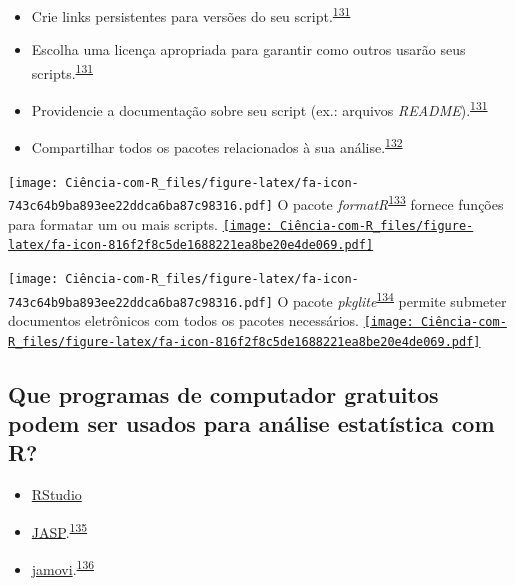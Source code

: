 \documentclass[
]{book}
\begin{document}
\begin{itemize}
\item
  Crie links persistentes para versões do seu script.\textsuperscript{\protect\hyperlink{ref-Eglen2017}{131}}
\item
  Escolha uma licença apropriada para garantir como outros usarão seus scripts.\textsuperscript{\protect\hyperlink{ref-Eglen2017}{131}}
\item
  Providencie a documentação sobre seu script (ex.: arquivos \emph{README}).\textsuperscript{\protect\hyperlink{ref-Eglen2017}{131}}
\item
  Compartilhar todos os pacotes relacionados à sua análise.\textsuperscript{\protect\hyperlink{ref-Zhao2023}{132}}
\end{itemize}

\texttt{[image: Ciência-com-R\_files/figure-latex/fa-icon-743c64b9ba893ee22ddca6ba87c98316.pdf]} O pacote \emph{formatR}\textsuperscript{\protect\hyperlink{ref-formatR}{133}} fornece funções para formatar um ou mais scripts. \href{https://cran.r-project.org/web/packages/formatR/index.html}{\texttt{[image: Ciência-com-R\_files/figure-latex/fa-icon-816f2f8c5de1688221ea8be20e4de069.pdf]}}

\texttt{[image: Ciência-com-R\_files/figure-latex/fa-icon-743c64b9ba893ee22ddca6ba87c98316.pdf]} O pacote \emph{pkglite}\textsuperscript{\protect\hyperlink{ref-pkglite}{134}} permite submeter documentos eletrônicos com todos os pacotes necessários. \href{https://cran.rstudio.com/web/packages/pkglite/index.html}{\texttt{[image: Ciência-com-R\_files/figure-latex/fa-icon-816f2f8c5de1688221ea8be20e4de069.pdf]}}

\hypertarget{que-programas-de-computador-gratuitos-podem-ser-usados-para-anuxe1lise-estatuxedstica-com-r}{%
\subsection{Que programas de computador gratuitos podem ser usados para análise estatística com R?}\label{que-programas-de-computador-gratuitos-podem-ser-usados-para-anuxe1lise-estatuxedstica-com-r}}

\begin{itemize}
\item
  \href{https://posit.co/downloads/}{RStudio}
\item
  \href{https://jasp-stats.org}{JASP}.\textsuperscript{\protect\hyperlink{ref-love2019}{135}}
\item
  \href{https://www.jamovi.org}{jamovi}.\textsuperscript{\protect\hyperlink{ref-sahin2020}{136}}
\end{itemize}
\end{document}
